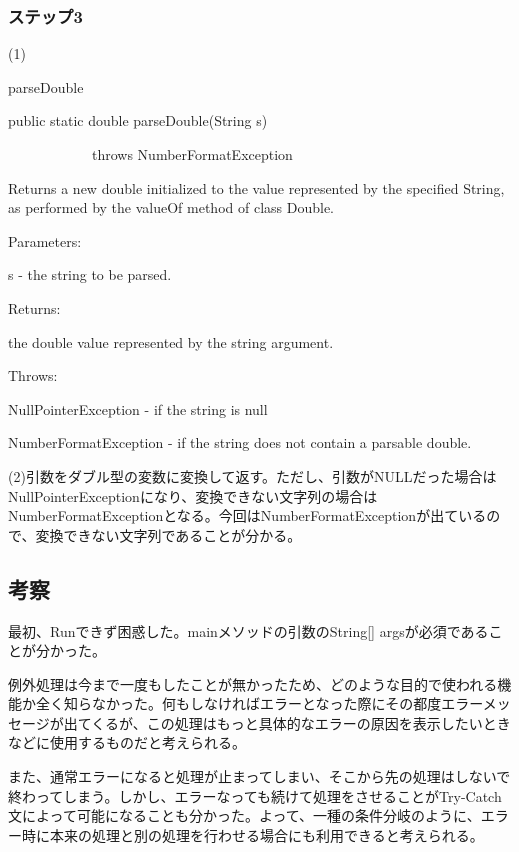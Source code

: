 \documentclass[12pt]{jsarticle}
\begin{document}
\subsubsection{ステップ3}
(1)

parseDouble

public static double parseDouble(String s)

　　　　　　throws NumberFormatException
                            
Returns a new double initialized to the value represented by the specified String, as performed by the valueOf method of class Double.
  
Parameters:

s - the string to be parsed.

Returns:

 the double value represented by the string argument.

Throws:

 NullPointerException - if the string is null

 NumberFormatException - if the string does not contain a parsable double.

\bigskip
(2)引数をダブル型の変数に変換して返す。ただし、引数がNULLだった場合はNullPointerExceptionになり、変換できない文字列の場合はNumberFormatExceptionとなる。今回はNumberFormatExceptionが出ているので、変換できない文字列であることが分かる。

\subsection{考察}
最初、Runできず困惑した。mainメソッドの引数のString[] argsが必須であることが分かった。

例外処理は今まで一度もしたことが無かったため、どのような目的で使われる機能か全く知らなかった。何もしなければエラーとなった際にその都度エラーメッセージが出てくるが、この処理はもっと具体的なエラーの原因を表示したいときなどに使用するものだと考えられる。

また、通常エラーになると処理が止まってしまい、そこから先の処理はしないで終わってしまう。しかし、エラーなっても続けて処理をさせることがTry-Catch文によって可能になることも分かった。よって、一種の条件分岐のように、エラー時に本来の処理と別の処理を行わせる場合にも利用できると考えられる。
\bigskip




\end{document}
